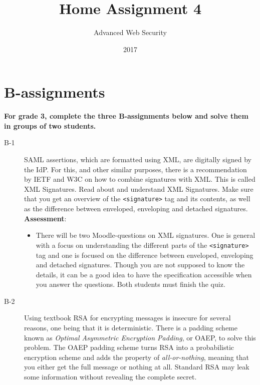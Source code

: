 \documentclass{article}
\begin{document}
	
	\title{Home Assignment 4}
	\author{Advanced Web Security}
	\date{2017}
	
	\maketitle
	
	\section*{B-assignments}
	\textbf{For grade 3, complete the three B-assignments below and solve them in groups of two students.}
	
	\begin{description}
		
		\item[B-1]{SAML assertions, which are formatted using XML, are digitally signed by the IdP. For this, and other similar purposes, there is a recommendation by IETF and W3C on how to combine signatures with XML. This is called XML Signatures. Read about and understand XML Signatures. Make sure that you get an overview of the \texttt{<signature>} tag and its contents, as well as the difference between enveloped, enveloping and detached signatures.\\
			\textbf{Assessment}:
			\begin{itemize}
				\item There will be two Moodle-questions on XML signatures. One is general with a focus on understanding the different parts of the \texttt{<signature>} tag and one is focused on the difference between enveloped, enveloping and detached signatures. Though you are not supposed to know the details, it can be a good idea to have the specification accessible when you answer the questions. Both students must finish the quiz.
			\end{itemize}}
			
			
			
			\item[B-2]{Using textbook RSA for encrypting messages is insecure for several reasons, one being that it
				is deterministic. There is a padding scheme known as \emph{Optimal Asymmetric Encryption Padding}, or OAEP, to solve
				this problem. The OAEP padding scheme turns RSA into a probabilistic encryption scheme and adds the property
				of \emph{all-or-nothing}, meaning that you either get the full message or nothing at all. Standard RSA may leak some
				information without revealing the complete secret.
				
}
\end{description}
\end{document}

